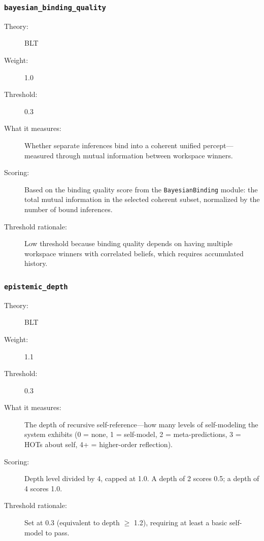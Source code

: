 \subsubsection{\texttt{bayesian\_binding\_quality}}
\begin{description}
  \item[Theory:] BLT \cite{laukkonen2025}
  \item[Weight:] 1.0
  \item[Threshold:] 0.3
  \item[What it measures:] Whether separate inferences bind into a coherent unified percept---measured through mutual information between workspace winners.
  \item[Scoring:] Based on the binding quality score from the \texttt{BayesianBinding} module: the total mutual information in the selected coherent subset, normalized by the number of bound inferences.
  \item[Threshold rationale:] Low threshold because binding quality depends on having multiple workspace winners with correlated beliefs, which requires accumulated history.
\end{description}

\subsubsection{\texttt{epistemic\_depth}}
\begin{description}
  \item[Theory:] BLT
  \item[Weight:] 1.1
  \item[Threshold:] 0.3
  \item[What it measures:] The depth of recursive self-reference---how many levels of self-modeling the system exhibits (0 = none, 1 = self-model, 2 = meta-predictions, 3 = HOTs about self, 4+ = higher-order reflection).
  \item[Scoring:] Depth level divided by 4, capped at 1.0. A depth of 2 scores 0.5; a depth of 4 scores 1.0.
  \item[Threshold rationale:] Set at 0.3 (equivalent to depth $\geq$ 1.2), requiring at least a basic self-model to pass.
\end{description}

